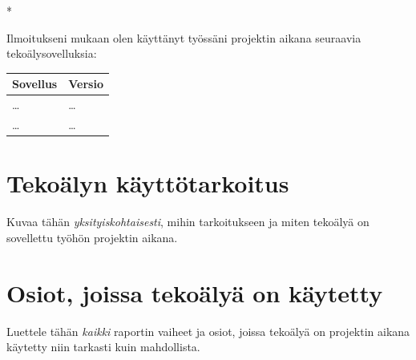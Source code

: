\begin{aidisclaimer} * %

Ilmoitukseni mukaan olen käyttänyt työssäni projektin aikana
seuraavia tekoälysovelluksia:

\begin{center}
    \begin{tabularx}{\linewidth}{Xl}
        \hline\hline
        \textbf{Sovellus} & \textbf{Versio} \\
        \hline
        \dots & \dots \\
        \dots & \dots \\
        \hline\hline
    \end{tabularx}
\end{center}

\section*{Tekoälyn käyttötarkoitus}

Kuvaa tähän \emph{yksityiskohtaisesti}, mihin tarkoitukseen ja miten tekoälyä
on sovellettu työhön projektin aikana.

\section*{Osiot, joissa tekoälyä on käytetty}

Luettele tähän \emph{kaikki} raportin vaiheet ja osiot, joissa tekoälyä on
projektin aikana käytetty niin tarkasti kuin mahdollista.

\end{aidisclaimer}
